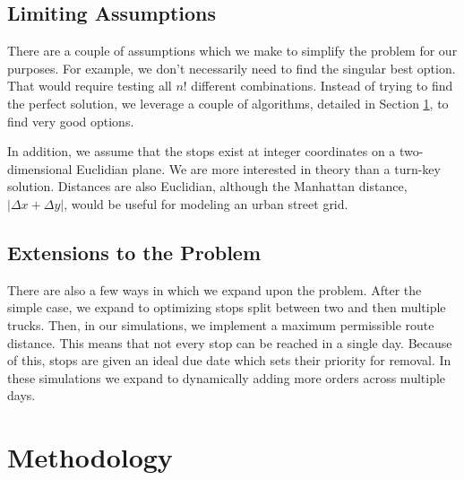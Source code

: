 \documentclass[letterpaper]{article}
\begin{document}
    \subsection{Limiting Assumptions}
    \label{subsection:Limiting_Assumptions}

    There are a couple of assumptions which we make to simplify the problem for our purposes. For example, we don't necessarily need to find the singular best option. That would require testing all $n!$ different combinations. Instead of trying to find the perfect solution, we leverage a couple of algorithms, detailed in Section \ref{section:Methodology}, to find very good options.

    In addition, we assume that the stops exist at integer coordinates on a two-dimensional Euclidian plane. We are more interested in theory than a turn-key solution. Distances are also Euclidian, although the Manhattan distance, $|\Delta x + \Delta y|$, would be useful for modeling an urban street grid.

    \subsection{Extensions to the Problem}
    There are also a few ways in which we expand upon the problem. After the simple case, we expand to optimizing stops split between two and then multiple trucks. Then, in our simulations, we implement a maximum permissible route distance. This means that not every stop can be reached in a single day. Because of this, stops are given an ideal due date which sets their priority for removal. In these simulations we expand to dynamically adding more orders across multiple days.

    \section{Methodology}
    \label{section:Methodology}
\end{document}
